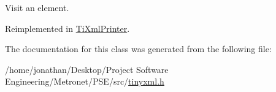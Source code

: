 Visit an element. 



Reimplemented in \hyperlink{class_ti_xml_printer_ae6a1df8271df4bf62d7873c38e34aa69}{Ti\+Xml\+Printer}.



The documentation for this class was generated from the following file\+:\begin{DoxyCompactItemize}
\item 
/home/jonathan/\+Desktop/\+Project Software Engineering/\+Metronet/\+P\+S\+E/src/\hyperlink{tinyxml_8h}{tinyxml.\+h}\end{DoxyCompactItemize}
